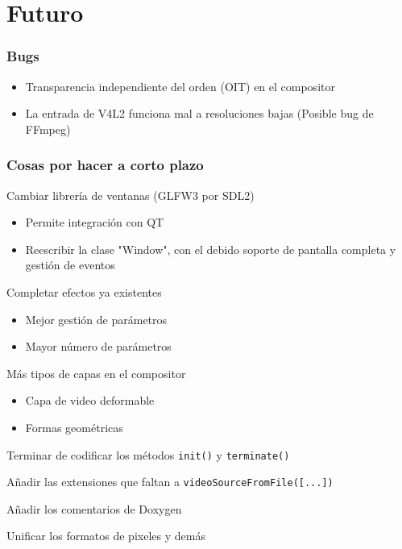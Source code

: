 \documentclass{beamer}
\begin{document}
%
%
\section{Futuro}

\begin{frame} \frametitle{Bugs}
	\begin{itemize}
		\item{Transparencia independiente del orden (OIT) en el compositor}
		\item{La entrada de V4L2 funciona mal a resoluciones bajas (Posible bug de FFmpeg)}
	\end{itemize}
\end{frame}

\begin{frame}[t] \frametitle{Cosas por hacer a corto plazo}
	\begin{itemize}
		\begin{item}
			Cambiar librería de ventanas (GLFW3 por SDL2)
			\begin{itemize}
				\item{Permite integración con QT}
				\item{Reescribir la clase "Window", con el debido soporte de pantalla completa y gestión de eventos}
			\end{itemize}
		\end{item}
		\begin{item}
			Completar efectos ya existentes
			\begin{itemize}
				\item{Mejor gestión de parámetros}
				\item{Mayor número de parámetros}
			\end{itemize}
		\end{item}
		\begin{item}
			Más tipos de capas en el compositor
			\begin{itemize}
				\item{Capa de video deformable}
				\item{Formas geométricas}
			\end{itemize}
		\end{item}
		\begin{item}
			Terminar de codificar los métodos \texttt{init()} y \texttt{terminate()}
		\end{item}
		\begin{item}
			Añadir las extensiones que faltan a \texttt{videoSourceFromFile([...])}
		\end{item}
		\begin{item}
			Añadir los comentarios de Doxygen
		\end{item}
		\begin{item}
			Unificar los formatos de pixeles y demás
		\end{item}
	\end{itemize}
\end{frame}
\end{document}

